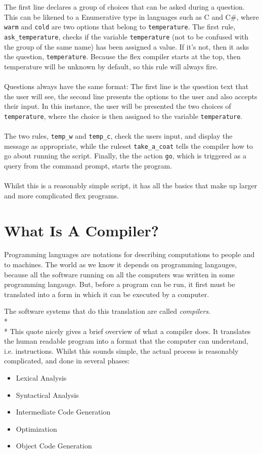 \documentclass[12pt]{report}
\begin{document}
The first line declares a group of choices that can be asked during a question.  This can be likened to a Enumerative type in languages such as C and C\#, where \texttt{warm} and \texttt{cold} are two options that belong to \texttt{temperature}.  The first rule, \texttt{ask\_temperature}, checks if the variable \texttt{temperature} (not to be confused with the group of the same name) has been assigned a value.  If it's not, then it asks the question, \texttt{temperature}.  Because the flex compiler starts at the top, then temperature will be unknown by default, so this rule will always fire.\\
\\
Questions always have the same format: The first line is the question text that the user will see, the second line presents the options to the user and also accepts their input.  In this instance, the user will be presented the two choices of \texttt{temperature}, where the choice is then assigned to the variable \texttt{temperature}.\\
\\
The two rules, \texttt{temp\_w} and \texttt{temp\_c}, check the users input, and display the message as appropriate, while the ruleset \texttt{take\_a\_coat} tells the compiler how to go about running the script.  Finally, the the action \texttt{go}, which is triggered as a query from the command prompt, starts the program.\\
\\
Whilst this is a reasonably simple script, it has all the basics that make up larger and more complicated flex programs.

\section{What Is A Compiler?}\label{sec:what_is_a_compiler}
Programming languages are notations for describing computations to people and to machines.  The world as we know it depends on programming langauges, because all the software running on all the computers was written in some programming langauge.  But, before a program can be run, it first must be translated into a form in which it can be executed by a computer.

The software systems that do this translation are called \textit{compilers}.\citep{compilers07}
\\*
\\*
This quote nicely gives a brief overview of what a compiler does.  It translates the human readable program into a format that the computer can understand, i.e. instructions.  Whilst this sounds simple, the actual process is reasonably complicated, and done in several phases:\\
\begin{itemize}
	\item Lexical Analysis
	\item Syntactical Analysis
	\item Intermediate Code Generation
	\item Optimization
	\item Object Code Generation
\end{itemize}\citep{compilerconstruction92}
\end{document}
